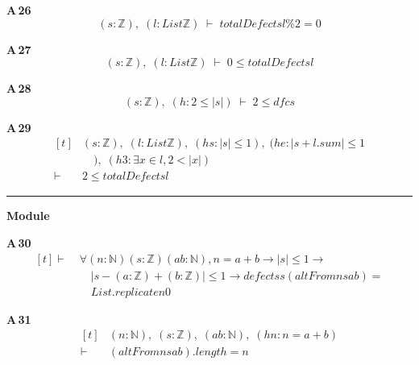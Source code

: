 \noindent\textbf{A\,26}\quad{}
{\footnotesize\[ (\mathit{s} : \mathbb{Z} ),\; (\mathit{l} : \mathit{List} \mathbb{Z} ) \;\vdash\; \mathit{totalDefect} \mathit{s} \mathit{l} \% 2 = 0 \]}

\noindent\textbf{A\,27}\quad{}
{\footnotesize\[ (\mathit{s} : \mathbb{Z} ),\; (\mathit{l} : \mathit{List} \mathbb{Z} ) \;\vdash\; 0 \leq \mathit{totalDefect} \mathit{s} \mathit{l} \]}

\noindent\textbf{A\,28}\quad{}
{\footnotesize\[ (\mathit{s} : \mathbb{Z} ),\; (\mathit{h} : 2 \leq |\mathit{s}|) \;\vdash\; 2 \leq \mathit{dfc} \mathit{s} \]}

\noindent\textbf{A\,29}\quad{}
{\footnotesize\[ \begin{aligned}[t]
&(\mathit{s} : \mathbb{Z} ),\; (\mathit{l} : \mathit{List} \mathbb{Z} ),\; (\mathit{hs} : |\mathit{s}| \leq 1),\; (\mathit{he} : |\mathit{s} + \mathit{l}.\mathit{sum}| \leq 1\\
&\quad ),\; (\mathit{h3} : \exists \mathit{x} \in \mathit{l}, 2 < |\mathit{x}|)\\
\vdash\;&2 \leq \mathit{totalDefect} \mathit{s} \mathit{l}
\end{aligned} \]}

\vspace{4pt}\noindent\rule{\columnwidth}{0.4pt}\par\vspace{2pt}
\noindent\textbf{Module }\par\vspace{3pt}

\noindent\textbf{A\,30}\quad{}
{\footnotesize\[ \begin{aligned}[t]
\vdash\;&\forall (\mathit{n} : \mathbb{N} ) (\mathit{s} : \mathbb{Z} ) (\mathit{a} \mathit{b} : \mathbb{N} ), \mathit{n} = \mathit{a} + \mathit{b} \to |\mathit{s}| \leq 1 \to\\
&\quad |\mathit{s} - (\mathit{a}:\mathbb{Z} ) + (\mathit{b}:\mathbb{Z} )| \leq 1 \to \mathit{defects} \mathit{s} (\mathit{altFrom} \mathit{n} \mathit{s} \mathit{a} \mathit{b}) =\\
&\quad \mathit{List}.\mathit{replicate} \mathit{n} 0
\end{aligned} \]}

\noindent\textbf{A\,31}\quad{}
{\footnotesize\[ \begin{aligned}[t]
&(\mathit{n} : \mathbb{N} ),\; (\mathit{s} : \mathbb{Z} ),\; (\mathit{a} \mathit{b} : \mathbb{N} ),\; (\mathit{hn} : \mathit{n} = \mathit{a} + \mathit{b})\\
\vdash\;&(\mathit{altFrom} \mathit{n} \mathit{s} \mathit{a} \mathit{b}).\mathit{length} = \mathit{n}
\end{aligned} \]}

